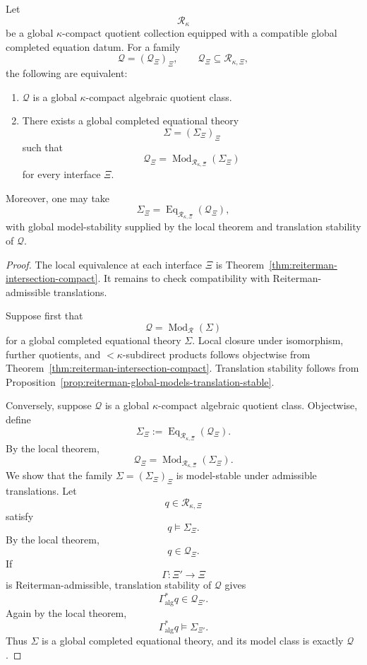 \begin{theorem}
\label{thm:reiterman-global-intersection-compact}
Let
\[
\mathcal R_\kappa
\]
be a global \(\kappa\)-compact quotient collection equipped with a compatible
global completed equation datum. For a family
\[
\mathcal Q=(\mathcal Q_\Xi)_\Xi,
\qquad
\mathcal Q_\Xi\subseteq\mathcal R_{\kappa,\Xi},
\]
the following are equivalent:
\begin{enumerate}
\item \(\mathcal Q\) is a global \(\kappa\)-compact algebraic quotient class.
\item There exists a global completed equational theory
\[
\Sigma=(\Sigma_\Xi)_\Xi
\]
such that
\[
\mathcal Q_\Xi
=
\operatorname{Mod}_{\mathcal R_{\kappa,\Xi}}(\Sigma_\Xi)
\]
for every interface \(\Xi\).
\end{enumerate}
Moreover, one may take
\[
\Sigma_\Xi
=
\operatorname{Eq}_{\mathcal R_{\kappa,\Xi}}(\mathcal Q_\Xi),
\]
with global model-stability supplied by the local theorem and translation
stability of \(\mathcal Q\).
\end{theorem}

\begin{proof}
The local equivalence at each interface \(\Xi\) is
Theorem~\ref{thm:reiterman-intersection-compact}. It remains to check
compatibility with Reiterman-admissible translations.

Suppose first that
\[
\mathcal Q=\operatorname{Mod}_{\mathcal R}(\Sigma)
\]
for a global completed equational theory \(\Sigma\). Local closure under
isomorphism, further quotients, and \(<\kappa\)-subdirect products follows
objectwise from Theorem~\ref{thm:reiterman-intersection-compact}.
Translation stability follows from
Proposition~\ref{prop:reiterman-global-models-translation-stable}.

Conversely, suppose \(\mathcal Q\) is a global \(\kappa\)-compact algebraic
quotient class. Objectwise, define
\[
\Sigma_\Xi
:=
\operatorname{Eq}_{\mathcal R_{\kappa,\Xi}}(\mathcal Q_\Xi).
\]
By the local theorem,
\[
\mathcal Q_\Xi
=
\operatorname{Mod}_{\mathcal R_{\kappa,\Xi}}(\Sigma_\Xi).
\]
We show that the family \(\Sigma=(\Sigma_\Xi)_\Xi\) is model-stable under
admissible translations. Let
\[
q\in\mathcal R_{\kappa,\Xi}
\]
satisfy
\[
q\models\Sigma_\Xi.
\]
By the local theorem,
\[
q\in\mathcal Q_\Xi.
\]
If
\[
\Gamma:\Xi'\to\Xi
\]
is Reiterman-admissible, translation stability of \(\mathcal Q\) gives
\[
\Gamma_{\mathrm{alg}}^\ast q\in\mathcal Q_{\Xi'}.
\]
Again by the local theorem,
\[
\Gamma_{\mathrm{alg}}^\ast q
\models
\Sigma_{\Xi'}.
\]
Thus \(\Sigma\) is a global completed equational theory, and its model class
is exactly \(\mathcal Q\).
\end{proof}


